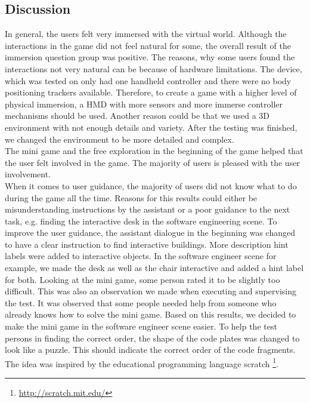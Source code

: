 \subsection{Discussion}
In general, the users felt very immersed with the virtual world. Although the interactions in the game did not feel natural for some, the overall result of the immersion question group was positive. The reasons, why some users found the interactions not very natural can be because of hardware limitations. The device, which was tested on only had one handheld controller and there were no body positioning trackers available. Therefore, to create a game with a higher level of physical immersion, a HMD with more sensors and more immerse controller mechanisms should be used. Another reason could be that we used a 3D environment with not enough details and variety. After the testing was finished, we changed the environment to be more detailed and complex.\\
The mini game and the free exploration in the beginning of the game helped that the user felt involved in the game. The majority of users is pleased with the user involvement.\\
When it comes to user guidance, the majority of users did not know what to do during the game all the time. Reasons for this results could either be misunderstanding instructions by the assistant or a poor guidance to the next task, e.g. finding the interactive desk in the software engineering scene. To improve the user guidance, the assistant dialogue in the beginning was changed to have a clear instruction to find interactive buildings. More description hint labels were added to interactive objects. In the software engineer scene for example, we made the desk as well as the chair interactive and added a hint label for both.
Looking at the mini game, some person rated it to be slightly too difficult. This was also an observation we made when executing and supervising the test. It was observed that some  people needed help from someone who already knows how to solve the mini game. Based on this results, we decided to make the mini game in the software engineer scene easier. To help the test persons in finding the correct order, the shape of the code plates was changed to look like a puzzle. This should indicate the correct order of the code fragments. The idea was inspired by the educational programming language scratch \footnote{\url{http://scratch.mit.edu/}}.